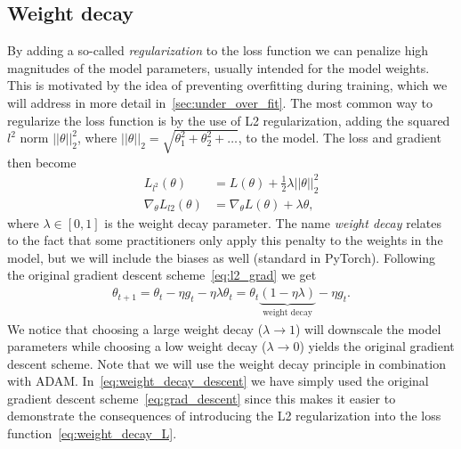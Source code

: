 \subsection{Weight decay}
By adding a so-called \textit{regularization} to the loss function we can penalize high magnitudes of the model parameters, usually intended for the model weights. This is motivated by the idea of preventing overfitting during training, which we will address in more detail in~\cref{sec:under_over_fit}.  The most common way to regularize the loss function is by the use of L2 regularization, adding the squared $l^2$ norm $||\theta||_2^2$, where $||\theta||_2 = \sqrt{\theta_1^2 + \theta_2^2 + \ldots}$, to the model. The loss and gradient then become
\begin{align}
  L_{l^2}(\theta) &= L(\theta) + \frac{1}{2}\lambda ||\theta||^2_2 \label{eq:weight_decay_L} \\
  \nabla_\theta L_{l2}(\theta) &=  \nabla_\theta L(\theta) + \lambda \theta,
  \label{eq:l2_grad}
\end{align}
where $\lambda\in [0,1]$ is the weight decay parameter. The name \textit{weight decay} relates to the fact that some practitioners only apply this penalty to the weights in the model, but we will include the biases as well (standard in PyTorch). Following the original gradient descent scheme~\cref{eq:l2_grad} we get
\begin{align}
  \theta_{t+1} = \theta_t - \eta g_t - \eta\lambda \theta_t = \theta_t\underbrace{(1-\eta\lambda)}_{\text{weight decay}} - \eta g_t. \label{eq:weight_decay_descent}
\end{align}
We notice that choosing a large weight decay ($\lambda \to 1$) will downscale the model parameters while choosing a low weight decay ($\lambda \to 0$) yields the original gradient descent scheme. Note that we will use the weight decay principle in combination with ADAM. In~\cref{eq:weight_decay_descent} we have simply used the original gradient descent scheme~\cref{eq:grad_descent} since this makes it easier to demonstrate the consequences of introducing the L2 regularization into the loss function~\cref{eq:weight_decay_L}.


